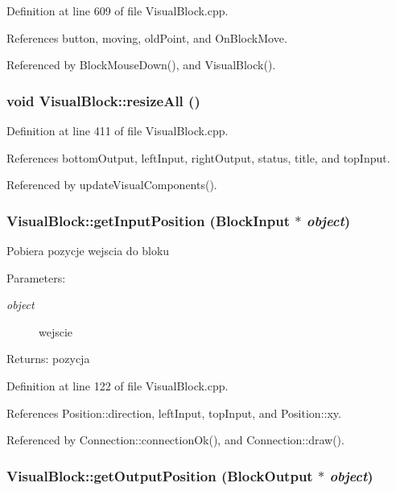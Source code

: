 Definition at line 609 of file VisualBlock.cpp.

References button, moving, oldPoint, and OnBlockMove.

Referenced by BlockMouseDown(), and VisualBlock().\hypertarget{classVisualBlock_120c84328c3017aec8fc669d156883a6}{
\subsubsection[resizeAll]{\setlength{\rightskip}{0pt plus 5cm}void VisualBlock::resizeAll ()}}
\label{classVisualBlock_120c84328c3017aec8fc669d156883a6}




Definition at line 411 of file VisualBlock.cpp.

References bottomOutput, leftInput, rightOutput, status, title, and topInput.

Referenced by updateVisualComponents().\hypertarget{classVisualBlock_f4bfdf59b184dd79ceaacb57f9acfd66}{
\subsubsection[getInputPosition]{ VisualBlock::getInputPosition ({\bf BlockInput} $\ast$ {\em object})}}
\label{classVisualBlock_f4bfdf59b184dd79ceaacb57f9acfd66}


Pobiera pozycje wejscia do bloku \begin{Desc}
\item[Parameters:]
\begin{description}
\item[{\em object}]wejscie \end{description}
\end{Desc}
\begin{Desc}
\item[Returns:]pozycja \end{Desc}


Definition at line 122 of file VisualBlock.cpp.

References Position::direction, leftInput, topInput, and Position::xy.

Referenced by Connection::connectionOk(), and Connection::draw().\hypertarget{classVisualBlock_840c712434dddf714a3cee9200073114}{
\subsubsection[getOutputPosition]{ VisualBlock::getOutputPosition ({\bf BlockOutput} $\ast$ {\em object})}}
\label{classVisualBlock_840c712434dddf714a3cee9200073114}


